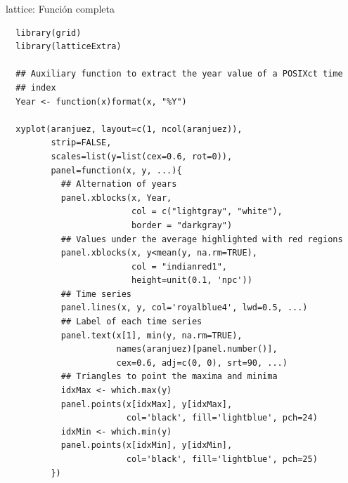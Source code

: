 \documentclass[xcolor={usenames,svgnames,dvipsnames}]{beamer}
\begin{document}
\begin{frame}[fragile,label=sec-2-3-1]{lattice: Función completa}
 \lstset{language=R,label= ,caption= ,numbers=none}
\begin{lstlisting}
  library(grid)
  library(latticeExtra)
  
  ## Auxiliary function to extract the year value of a POSIXct time
  ## index
  Year <- function(x)format(x, "%Y")
  
  xyplot(aranjuez, layout=c(1, ncol(aranjuez)),
         strip=FALSE,
         scales=list(y=list(cex=0.6, rot=0)),
         panel=function(x, y, ...){
           ## Alternation of years
           panel.xblocks(x, Year,
                         col = c("lightgray", "white"),
                         border = "darkgray")
           ## Values under the average highlighted with red regions
           panel.xblocks(x, y<mean(y, na.rm=TRUE),
                         col = "indianred1",
                         height=unit(0.1, 'npc'))
           ## Time series
           panel.lines(x, y, col='royalblue4', lwd=0.5, ...)
           ## Label of each time series
           panel.text(x[1], min(y, na.rm=TRUE),
                      names(aranjuez)[panel.number()],
                      cex=0.6, adj=c(0, 0), srt=90, ...)
           ## Triangles to point the maxima and minima 
           idxMax <- which.max(y)
           panel.points(x[idxMax], y[idxMax],
                        col='black', fill='lightblue', pch=24)
           idxMin <- which.min(y)
           panel.points(x[idxMin], y[idxMin],
                        col='black', fill='lightblue', pch=25)
         })
\end{lstlisting}
\end{frame}
\end{document}
